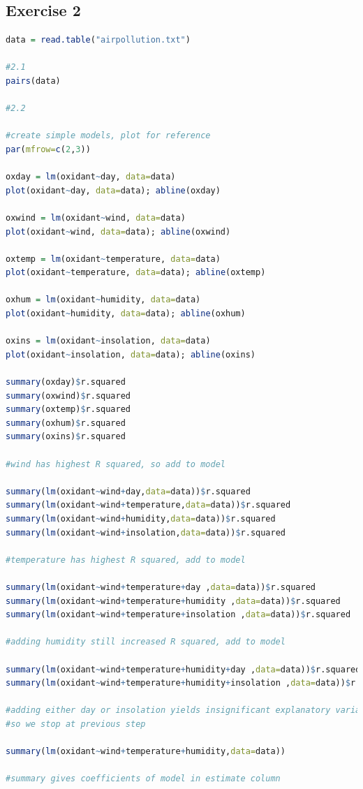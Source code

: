\documentclass{article}
\begin{document}
    \subsection{Exercise 2}\label{sec:RE2}
      \begin{lstlisting}[language=R]
      data = read.table("airpollution.txt")

#2.1
pairs(data)

#2.2

#create simple models, plot for reference
par(mfrow=c(2,3))

oxday = lm(oxidant~day, data=data)
plot(oxidant~day, data=data); abline(oxday)

oxwind = lm(oxidant~wind, data=data)
plot(oxidant~wind, data=data); abline(oxwind)

oxtemp = lm(oxidant~temperature, data=data)
plot(oxidant~temperature, data=data); abline(oxtemp)

oxhum = lm(oxidant~humidity, data=data)
plot(oxidant~humidity, data=data); abline(oxhum)

oxins = lm(oxidant~insolation, data=data)
plot(oxidant~insolation, data=data); abline(oxins)

summary(oxday)$r.squared
summary(oxwind)$r.squared
summary(oxtemp)$r.squared
summary(oxhum)$r.squared
summary(oxins)$r.squared

#wind has highest R squared, so add to model

summary(lm(oxidant~wind+day,data=data))$r.squared
summary(lm(oxidant~wind+temperature,data=data))$r.squared
summary(lm(oxidant~wind+humidity,data=data))$r.squared
summary(lm(oxidant~wind+insolation,data=data))$r.squared

#temperature has highest R squared, add to model

summary(lm(oxidant~wind+temperature+day ,data=data))$r.squared
summary(lm(oxidant~wind+temperature+humidity ,data=data))$r.squared
summary(lm(oxidant~wind+temperature+insolation ,data=data))$r.squared

#adding humidity still increased R squared, add to model

summary(lm(oxidant~wind+temperature+humidity+day ,data=data))$r.squared
summary(lm(oxidant~wind+temperature+humidity+insolation ,data=data))$r.squared

#adding either day or insolation yields insignificant explanatory variables
#so we stop at previous step

summary(lm(oxidant~wind+temperature+humidity,data=data))

#summary gives coefficients of model in estimate column


\end{lstlisting}
\end{document}
